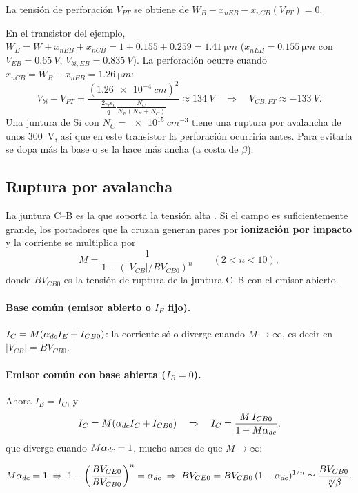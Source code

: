 La tensión de perforación $V_{PT}$ se obtiene de $W_B - x_{nEB} - x_{nCB}(V_{PT}) = 0$.

\begin{ejemplo}
En el transistor del ejemplo, $W_B = W + x_{nEB}+x_{nCB} = 1 + 0.155 + 0.259 = \SI{1.41}{\micro m}$
($x_{nEB}=\SI{0.155}{\micro m}$ con $V_{EB}=\SI{0.65}{V}$, $V_{bi,EB}=\SI{0.835}{V}$). La perforación
ocurre cuando $x_{nCB}=W_B-x_{nEB}=\SI{1.26}{\micro m}$:
\[
  V_{bi}-V_{PT} = \frac{(\SI{1.26e-4}{cm})^2}{\frac{2\epsilon_r\epsilon_0}{q}\frac{N_C}{N_B(N_B+N_C)}}
  \approx\SI{134}{V}
  \quad\Rightarrow\quad V_{CB,PT}\approx\SI{-133}{V}.
\]
Una juntura de Si con $N_C=\SI{e15}{cm^{-3}}$ tiene una ruptura por avalancha de unos
\SI{300}{V}, así que en este transistor la perforación ocurriría antes. Para evitarla se
dopa más la base o se la hace más ancha (a costa de $\beta$).
\end{ejemplo}

\subsection{Ruptura por avalancha}

La juntura C--B es la que soporta la tensión alta . Si el campo es suficientemente
grande, los portadores que la cruzan generan pares por \textbf{ionización por impacto} y la
corriente se multiplica por
\[
  M = \frac{1}{1-\left(|V_{CB}|/BV_{CB0}\right)^n}\qquad (2<n<10),
\]
donde $BV_{CB0}$ es la tensión de ruptura de la juntura C--B con el emisor abierto.

\paragraph{Base común (emisor abierto o $I_E$ fijo).} $I_C=M(\alpha_{dc} I_E+I_{CB0})$: la corriente
sólo diverge cuando $M\to\infty$, es decir en $|V_{CB}|=BV_{CB0}$.

\paragraph{Emisor común con base abierta ($I_B=0$).} Ahora $I_E=I_C$, y
\[
  I_C = M(\alpha_{dc} I_C+I_{CB0})\quad\Rightarrow\quad I_C=\frac{M\,I_{CB0}}{1-M\alpha_{dc}},
\]
que diverge cuando $M\alpha_{dc}=1$, mucho antes de que $M\to\infty$:
\begin{clave}
\[
  M\alpha_{dc}=1 \;\Rightarrow\; 1-\left(\frac{BV_{CE0}}{BV_{CB0}}\right)^n=\alpha_{dc}
  \;\Rightarrow\;
  BV_{CE0} = BV_{CB0}\,(1-\alpha_{dc})^{1/n} \simeq \frac{BV_{CB0}}{\sqrt[n]{\beta}} .
\]
\end{clave}

